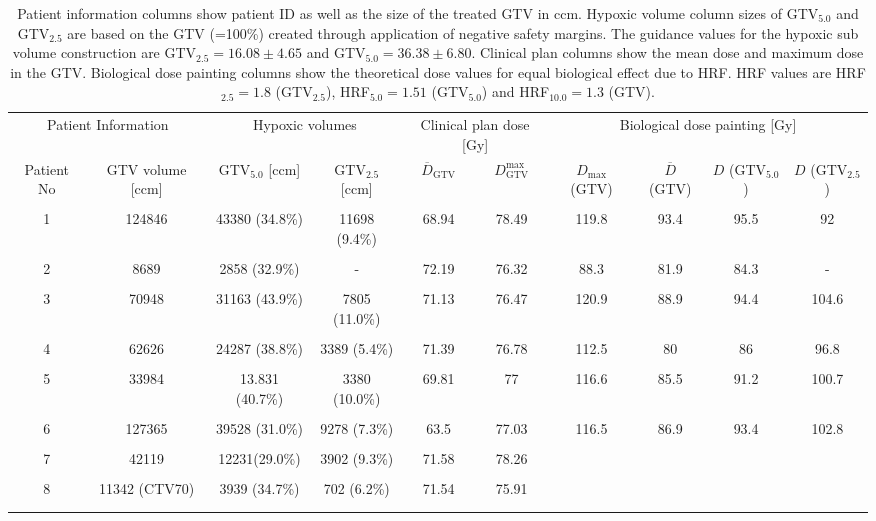 \begin{sidewaystable}[p]
\centering
\footnotesize
\begin{tabular}{cccccccccc}
\toprule
\multicolumn{2}{c}{Patient Information} & \multicolumn{2}{c}{Hypoxic volumes} & \multicolumn{2}{c}{Clinical plan dose [Gy]} &  \multicolumn{4}{c}{Biological dose painting [Gy]}\\
\cmidrule(r){1-2} \cmidrule(r){3-4}\cmidrule(r){5-6}\cmidrule(r){7-10}
Patient No & GTV volume [ccm] & GTV$_{5.0}$ [ccm]& GTV$_{2.5}$ [ccm] & $\overline D_\mathrm{GTV}$ & $D_\mathrm{GTV}^\mathrm{max} $ & $D_\mathrm{max}$ (GTV) &  $\overline D$ (GTV) & $D$ (GTV$_{5.0}$) & $D$ (GTV$_{2.5}$)\\
\midrule\\
1	&	124846	&	43380 (34.8\%)	&	11698 (9.4\%)	&	68.94	&	78.49	&	119.8	&	93.4	&	95.5	&	92	\\\\
2	&	8689	&	2858 (32.9\%)	&	-	&	72.19	&	76.32	&	88.3	&	81.9	&	84.3	&	-	\\\\
3	&	70948	&	31163 (43.9\%)	&	7805 (11.0\%)	&	71.13	&	76.47	&	120.9	&	88.9	&	94.4	&	104.6	\\\\
4	&	62626	&	24287 (38.8\%)	&	3389 (5.4\%)	&	71.39	&	76.78	&	112.5	&	80	&	86	&	96.8	\\\\
5	&	33984	&	13.831 (40.7\%)	&	3380 (10.0\%)	&	69.81	&	77	&	116.6	&	85.5	&	91.2	&	100.7	\\\\
6	&	127365	&	39528 (31.0\%)	&	9278 (7.3\%)	&	63.5	&	77.03	&	116.5	&	86.9	&	93.4	&	102.8	\\\\
7	&	42119	&	12231(29.0\%)	&	3902 (9.3\%)	&	71.58	&	78.26	&		&		&		&		\\\\
8	&	11342 (CTV70)	&	3939 (34.7\%)	&	702 (6.2\%)	&	71.54	&	75.91	&		&		&		&		\\\\
\bottomrule\\
\end{tabular}
\caption{Patient information columns show patient ID as well as the size of the treated GTV in ccm. Hypoxic volume column sizes of GTV$_{5.0}$ and GTV$_{2.5}$ are based on the GTV (=100\%) created through application of negative safety margins. The guidance values for the hypoxic sub volume construction are GTV$_{2.5}=16.08\pm 4.65$ and GTV$_{5.0}=36.38\pm 6.80$. Clinical plan columns show the mean dose and maximum dose in the GTV. Biological dose painting columns show the theoretical dose values for equal biological effect due to HRF. HRF values are HRF$_{2.5}=1.8$ (GTV$_{2.5}$), HRF$_{5.0}=1.51$ (GTV$_{5.0}$) and HRF$_{10.0}=1.3$ (GTV).}
\label{tab:patientgtv}
\end{sidewaystable}
